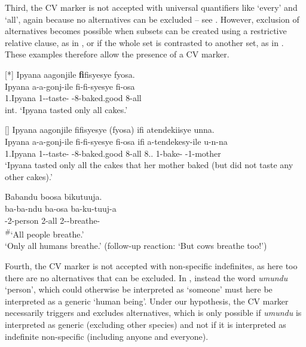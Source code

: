 \documentclass[output=paper]{langscibook}
\begin{document}
\z


Third, the CV marker is not accepted with universal quantifiers like ‘every’ and ‘all’, again because no alternatives can be excluded – see . However, exclusion of alternatives becomes possible when subsets can be created using a restrictive relative clause, as in , or if the whole set is contrasted to another set, as in . These examples therefore allow the presence of a CV marker.

\ea
\label{bkm:Ref56944146}
\ea
[*]{
\label{bkm:Ref56944146:a}
Ipyana aagonjile \textbf{fi}fisyesye fyosa.\\
\gll
Ipyana  a-a-gonj-ile  fi-fi-syesye  fi-osa\\
1.Ipyana  1\SM{}-\PST{}-taste-\PFV{}  \EXH{}-8-baked.good  8-all\\
\glt
int. ‘Ipyana tasted only all cakes.’\\
}

\ex
[]{
\label{bkm:Ref56944146:b} 
Ipyana aagonjile fifisyesye (fyosa) ifi atendekiisye unna.\\
\gll
Ipyana  a-a-gonj-ile  fi-fi-syesye  fi-osa ifi  a-tendekesy-ile  u-n-na \\
1.Ipyana  1\SM{}-\PST{}-taste-\PFV{}  \EXH{}-8-baked.good  8-all 8.\DEM{}.\PROX{}  1\SM{}-bake-\PFV{}   \AUG{}-1-mother\\
\glt ‘Ipyana tasted only all the cakes that her mother baked (but did not taste any other cakes).’ \citep[337--338]{vanderWalLusekelo2022}
}

\z
\z
\pagebreak

\ea
\label{bkm:Ref76978930}
\label{bkm:Ref56944170}Babandu boosa bikutuuja.\\
\gll
ba-ba-ndu  ba-osa  ba-ku-tuuj-a\\
\EXH{}-2-person  2-all  2\SM{}-\PRS{}-breathe-\FV{}\\
\glt
\textsuperscript{\#}`All people breathe.’\\

‘Only all humans breathe.’ (follow-up reaction: ‘But cows breathe too!’) \citep[338]{vanderWalLusekelo2022}\\
\z

Fourth, the CV marker is not accepted with non-specific indefinites, as here too there are no alternatives that can be excluded. In , instead the word \textit{umundu} ‘person’, which could otherwise be interpreted as ‘someone’ must here be interpreted as a generic ‘human being’. Under our hypothesis, the CV marker necessarily triggers and excludes alternatives, which is only possible if \textit{umundu} is interpreted as generic (excluding other species) and not if it is interpreted as indefinite non-specific (including anyone and everyone).
\end{document}

